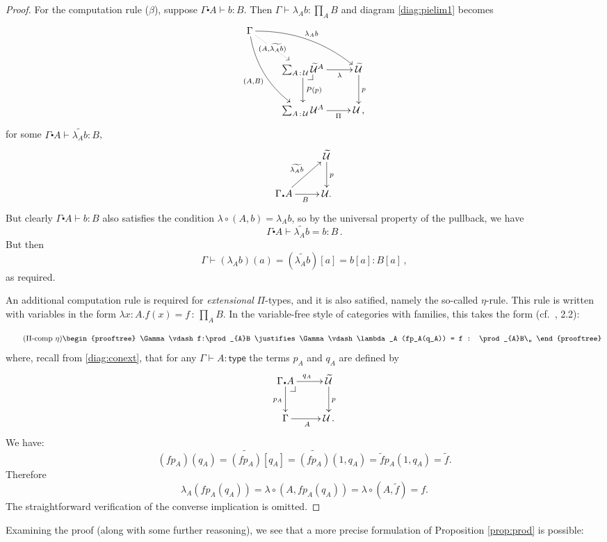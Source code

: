 \documentclass[12pt]{article}
\makeatletter
\newcommand{\pbcorner}[1][dr]{\save*!/#1-1.2pc/#1:(-1,1)@^{|-}\restore}
\newcommand{\G}{\ensuremath{\Gamma}}
\newcommand{\type}{\mathsf{type}}
\newcommand{\types}[2]{#1 \vdash #2:\type}
\newcommand{\Gtypes}[1]{\types{\Gamma}{#1}}
\newcommand{\terms}[2]{#1 \vdash #2}
\newcommand{\Gterms}[1]{\terms{\Gamma}{#1}}
\newcommand{\ext}[2]{{#1\!\centerdot\! #2}}
\newcommand{\ty}{\ensuremath{\,:\,}}
\newcommand{\U}{\ensuremath{\mathcal{U}}}
\newcommand{\UU}{\ensuremath{\widetilde{\mathcal{U}}}}
\theoremstyle{definition}
\makeatother
\begin{document}
\begin{proof}
For the computation rule ($\beta$), suppose $\terms{\ext{\G}{A}}{b:B}$.  Then $\Gterms{\lambda_A b: \prod_{A}B}$ and diagram \eqref{diag:pielim1} becomes
%
\begin{equation}\label{diag:pielim2}
\xymatrix{
\G  \ar@/{}_{1pc}/[ddr]_{(A,B)} \ar@{.>}[dr]|-{(A,\widetilde{\lambda_A b})} \ar@/{}^{1pc}/[drr]^{\lambda_A b} \\
& \sum_{A\ty\U}\UU^{A}  \ar[d]^{P(p)} \ar[r]_-{\lambda} \pbcorner &  \UU \ar[d]^{p}\\
&\sum_{A\ty\U}\U^{A}  \ar[r]_-{\Pi}   & \U \,,}
\end{equation}
%
for some $\terms{\ext{\G}{A}}{\widetilde{\lambda_A b}:B}$,
\[
\xymatrix{
 	&  \UU \ar[d]^{p}\\
\ext{\G}{A} \ar[ru]^{\widetilde{\lambda_A b}}   \ar[r]_{B}   & \U.}
\]
But clearly $\terms{\ext{\G}{A}}{b:B}$ also satisfies the condition $\lambda\circ(A,b)=\lambda_Ab$, so by the universal property of the pullback, we have
\[
\terms{\ext{\G}{A}}{\widetilde{\lambda_A b} = b:B}\,.
\]
But then
\[
\Gterms{(\lambda_A b)(a) = (\widetilde{\lambda_A b})[a] = b[a] : B[a]}\,,
\]
as required.

An additional computation rule is required for \emph{extensional} $\Pi$-types, and it is also satified, namely the so-called $\eta$-rule.  This rule is written with variables in the form ${{\lambda}x:A}.f(x) = f\ty \prod_{A}B$.  In the variable-free style of categories with families, this takes the form (cf.~\cite{CwF}, 2.2):

\[\tag{\text{$\Pi$-comp $\eta$}}
\begin{prooftree}
\Gterms{f:\prod_{A}B}
\justifies
\Gterms{\lambda_A (fp_A(q_A)) = f : \prod_{A}B}\,,
 \end{prooftree}
\]
where, recall from \eqref{diag:conext}, that for any $\Gtypes{A}$ the terms $p_A$ and $q_A$ are defined by
%
\begin{equation*}
\xymatrix{
\ext{\G}{A} \ar[d]_{p_A} \ar[r]^{q_A} \pbcorner &  \UU \ar[d]^{p}\\
\G \ar[r]_{A}   & \U\,.
}
\end{equation*}
We have:
\[
(fp_A)(q_A) = \widetilde{(fp_A)}[q_A] = \widetilde{(fp_A)}(1, q_A) = \widetilde{f}p_A(1, q_A) = \widetilde{f}.
\]
Therefore 
\[
\lambda_A (fp_A(q_A)) = \lambda\circ(A, fp_A(q_A)) = \lambda\circ(A, \widetilde{f}) = f.
\]
The straightforward verification of the converse implication is omitted.
\end{proof}

Examining the proof (along with some further reasoning), we see that a more precise formulation of Proposition \ref{prop:prod} is possible: 
\end{document}
